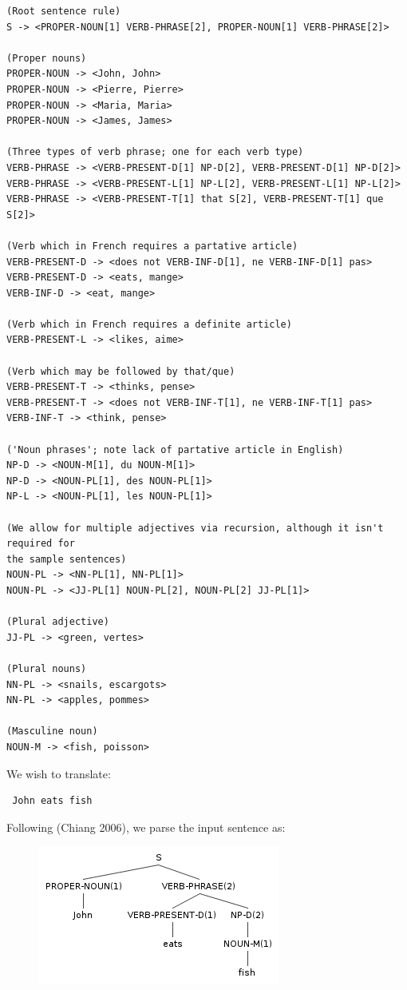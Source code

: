 \documentclass[11pt]{article}
\begin{document}
\small
\begin{verbatim}
(Root sentence rule)
S -> <PROPER-NOUN[1] VERB-PHRASE[2], PROPER-NOUN[1] VERB-PHRASE[2]>

(Proper nouns)
PROPER-NOUN -> <John, John>
PROPER-NOUN -> <Pierre, Pierre>
PROPER-NOUN -> <Maria, Maria>
PROPER-NOUN -> <James, James>

(Three types of verb phrase; one for each verb type)
VERB-PHRASE -> <VERB-PRESENT-D[1] NP-D[2], VERB-PRESENT-D[1] NP-D[2]>
VERB-PHRASE -> <VERB-PRESENT-L[1] NP-L[2], VERB-PRESENT-L[1] NP-L[2]>
VERB-PHRASE -> <VERB-PRESENT-T[1] that S[2], VERB-PRESENT-T[1] que S[2]>

(Verb which in French requires a partative article)
VERB-PRESENT-D -> <does not VERB-INF-D[1], ne VERB-INF-D[1] pas>
VERB-PRESENT-D -> <eats, mange>
VERB-INF-D -> <eat, mange>

(Verb which in French requires a definite article)
VERB-PRESENT-L -> <likes, aime>

(Verb which may be followed by that/que)
VERB-PRESENT-T -> <thinks, pense>
VERB-PRESENT-T -> <does not VERB-INF-T[1], ne VERB-INF-T[1] pas>
VERB-INF-T -> <think, pense>

('Noun phrases'; note lack of partative article in English)
NP-D -> <NOUN-M[1], du NOUN-M[1]>
NP-D -> <NOUN-PL[1], des NOUN-PL[1]>
NP-L -> <NOUN-PL[1], les NOUN-PL[1]>

(We allow for multiple adjectives via recursion, although it isn't required for
the sample sentences)
NOUN-PL -> <NN-PL[1], NN-PL[1]>
NOUN-PL -> <JJ-PL[1] NOUN-PL[2], NOUN-PL[2] JJ-PL[1]>

(Plural adjective)
JJ-PL -> <green, vertes>

(Plural nouns)
NN-PL -> <snails, escargots>
NN-PL -> <apples, pommes>

(Masculine noun)
NOUN-M -> <fish, poisson>

\end{verbatim}
\normalsize
We wish to translate:
\begin{verbatim} John eats fish \end{verbatim}
Following (Chiang 2006)\cite{Chiang2006}, we parse the input sentence as:

\begin{figure}[H]
\includegraphics[scale=0.8]{john-eats-fish.png}
\end{figure}
\end{document}

